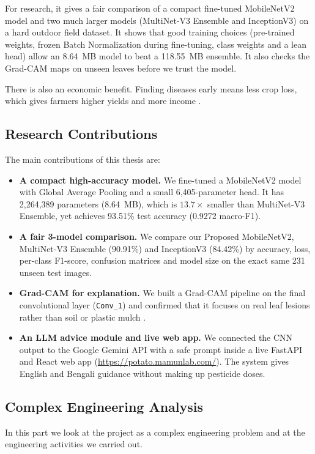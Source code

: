For research, it gives a fair comparison of a compact fine-tuned MobileNetV2 model and two much larger models (MultiNet-V3 Ensemble and InceptionV3) on a hard outdoor field dataset. It shows that good training choices (pre-trained weights, frozen Batch Normalization during fine-tuning, class weights and a lean head) allow an 8.64~MB model to beat a 118.55~MB ensemble. It also checks the Grad-CAM maps on unseen leaves before we trust the model.

There is also an economic benefit. Finding diseases early means less crop loss, which gives farmers higher yields and more income \cite{strange2005plant}.

\subsection{Research Contributions}
The main contributions of this thesis are:
\begin{itemize}
    \item \textbf{A compact high-accuracy model.} We fine-tuned a MobileNetV2 model \cite{sandler2018mobilenetv2} with Global Average Pooling and a small 6,405-parameter head. It has 2,264,389 parameters (8.64~MB), which is $13.7\times$ smaller than MultiNet-V3 Ensemble, yet achieves 93.51\% test accuracy (0.9272 macro-F1).
    \item \textbf{A fair 3-model comparison.} We compare our Proposed MobileNetV2, MultiNet-V3 Ensemble (90.91\%) and InceptionV3 (84.42\%) by accuracy, loss, per-class F1-score, confusion matrices and model size on the exact same 231 unseen test images.
    \item \textbf{Grad-CAM for explanation.} We built a Grad-CAM pipeline on the final convolutional layer (\texttt{Conv\_1}) and confirmed that it focuses on real leaf lesions rather than soil or plastic mulch \cite{selvaraju2017grad}.
    \item \textbf{An LLM advice module and live web app.} We connected the CNN output to the Google Gemini API with a safe prompt inside a live FastAPI and React web app (\url{https://potato.mamunlab.com/}). The system gives English and Bengali guidance without making up pesticide doses.
\end{itemize}

\subsection{Complex Engineering Analysis}
In this part we look at the project as a complex engineering problem and at the engineering activities we carried out.

